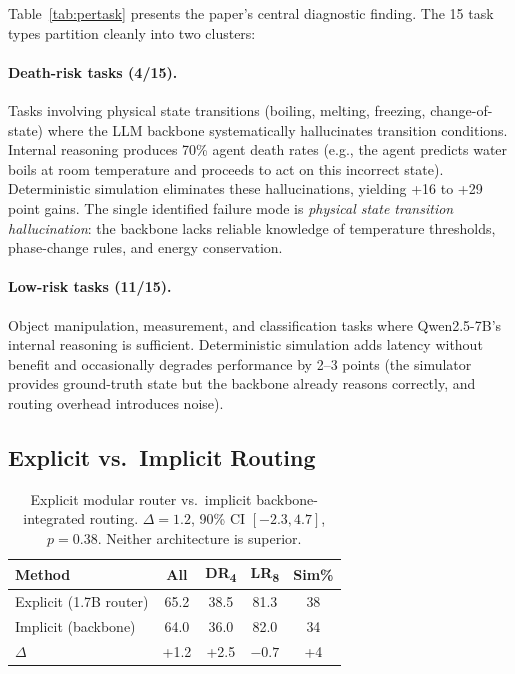 \documentclass[11pt,a4paper]{article}
\begin{document}
Table~\ref{tab:pertask} presents the paper's central diagnostic finding. The 15 task types partition cleanly into two clusters:

\paragraph{Death-risk tasks (4/15).} Tasks involving physical state transitions (boiling, melting, freezing, change-of-state) where the LLM backbone systematically hallucinates transition conditions. Internal reasoning produces 70\% agent death rates (e.g., the agent predicts water boils at room temperature and proceeds to act on this incorrect state). Deterministic simulation eliminates these hallucinations, yielding +16 to +29 point gains. The single identified failure mode is \emph{physical state transition hallucination}: the backbone lacks reliable knowledge of temperature thresholds, phase-change rules, and energy conservation.

\paragraph{Low-risk tasks (11/15).} Object manipulation, measurement, and classification tasks where Qwen2.5-7B's internal reasoning is sufficient. Deterministic simulation adds latency without benefit and occasionally degrades performance by 2--3 points (the simulator provides ground-truth state but the backbone already reasons correctly, and routing overhead introduces noise).

\subsection{Explicit vs.\ Implicit Routing}

\begin{table}[t]
\centering
\small
\begin{tabular}{lcccc}
\toprule
\textbf{Method} & \textbf{All} & \textbf{DR\textsubscript{4}} & \textbf{LR\textsubscript{8}} & \textbf{Sim\%} \\
\midrule
Explicit (1.7B router) & 65.2 & 38.5 & 81.3 & 38 \\
Implicit (backbone) & 64.0 & 36.0 & 82.0 & 34 \\
\midrule
$\Delta$ & +1.2 & +2.5 & $-0.7$ & +4 \\
\bottomrule
\end{tabular}
\caption{Explicit modular router vs.\ implicit backbone-integrated routing. $\Delta{=}1.2$, 90\% CI $[-2.3, 4.7]$, $p{=}0.38$. Neither architecture is superior.}
\label{tab:explicit}
\end{table}
\end{document}
